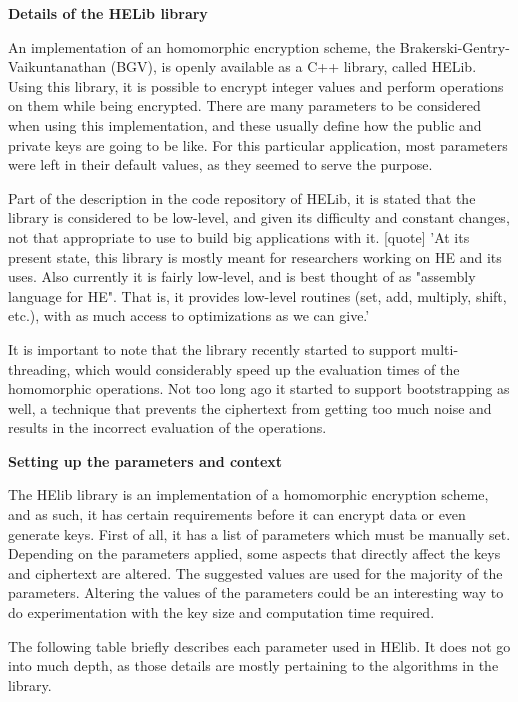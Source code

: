 \textbf{Details of the HELib library}

An implementation of an homomorphic encryption scheme, the Brakerski-Gentry-Vaikuntanathan (BGV), is openly available as a C++ library, called HELib. Using this library, it is possible to encrypt integer values and perform operations on them while being encrypted. There are many parameters to be considered when using this implementation, and these usually define how the public and private keys are going to be like. For this particular application, most parameters were left in their default values, as they seemed to serve the purpose. 

Part of the description in the code repository of HELib, it is stated that the library is considered to be low-level, and given its difficulty and constant changes, not that appropriate to use to build big applications with it.  [quote] 'At its present state, this library is mostly meant for researchers working on HE and its uses. Also currently it is fairly low-level, and is best thought of as "assembly language for HE". That is, it provides low-level routines (set, add, multiply, shift, etc.), with as much access to optimizations as we can give.'

It is important to note that the library recently started to support multi-threading, which would considerably speed up the evaluation times of the homomorphic operations. Not too long ago it started to support bootstrapping as well, a technique that prevents the ciphertext from getting too much noise and results in the incorrect evaluation of the operations.

\textbf{Setting up the parameters and context}

The HElib library is an implementation of a homomorphic encryption scheme, and as such, it has certain requirements before it can encrypt data or even generate keys. First of all, it has a list of parameters which must be manually set. Depending on the parameters applied, some aspects that directly affect the keys and ciphertext are altered. The suggested values are used for the majority of the parameters. Altering the values of the parameters could be an interesting way to do experimentation with the key size and computation time required.

The following table briefly describes each parameter used in HElib. It does not go into much depth, as those details are mostly pertaining to the algorithms in the library.

